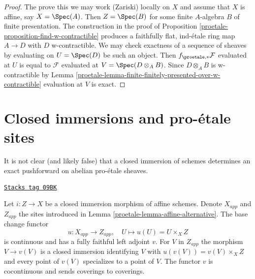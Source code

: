 \begin{proof}

The prove this we may work (Zariski) locally on $X$ and assume that $X$
is affine, say $X = \Spec(A)$. Then $Z = \Spec(B)$ for some finite
$A$-algebra $B$ of finite presentation. The construction in the proof of
Proposition \ref{proetale-proposition-find-w-contractible}
produces a faithfully flat, ind-\'etale ring map $A \to D$
with $D$ w-contractible. We may check exactness of a sequence of
sheaves by evaluating on $U = \Spec(D)$ be such an object. Then
$f_{\proetale, *}\mathcal{F}$
evaluated at $U$ is equal to $\mathcal{F}$ evaluated at
$V = \Spec(D \otimes_A B)$. Since $D \otimes_A B$ is w-contractible
by Lemma \ref{proetale-lemma-finite-finitely-presented-over-w-contractible}
evaluation at $V$ is exact.
\end{proof}

\section{Closed immersions and pro-\'etale sites}
\label{proetale-section-closed-immersion}
It is not clear (and likely false) that a closed immersion of schemes
determines an exact pushforward on abelian pro-\'etale sheaves.

\begin{lemma}
\label{proetale-lemma-closed-immersion-affines}
\href{https://stacks.math.columbia.edu/tag/09BK}{\texttt{Stacks tag 09BK}}

Let $i : Z \to X$ be a closed immersion morphism of affine schemes.
Denote $X_{app}$ and $Z_{app}$ the sites introduced in
Lemma \ref{proetale-lemma-affine-alternative}.
The base change functor
$$
u : X_{app} \to Z_{app},\quad U \longmapsto u(U) = U \times_X Z
$$
is continuous and has a fully faithful left adjoint $v$.
For $V$ in $Z_{app}$ the morphism $V \to v(V)$ is a closed immersion
identifying $V$ with $u(v(V)) = v(V) \times_X Z$ and every point of
$v(V)$ specializes to a point of $V$.
The functor $v$ is cocontinuous and sends coverings to coverings.
\end{lemma}

